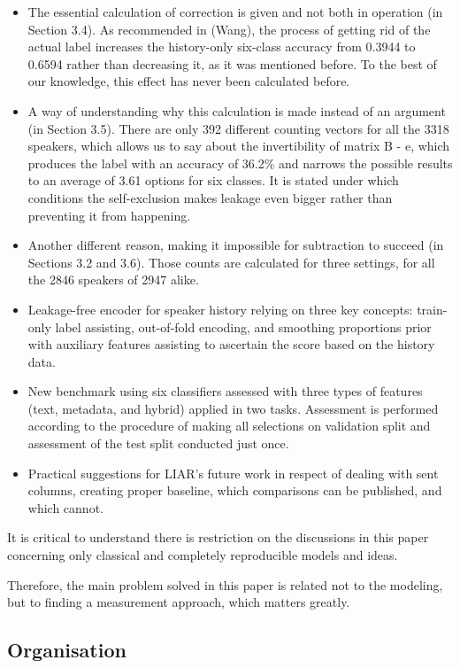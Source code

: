 \documentclass[10pt,twocolumn,twoside,a4paper]{article}
\begin{document}
\begin{itemize}
\item The essential calculation of correction is given and not both in operation (in Section 3.4). As recommended in (Wang), the process of getting rid of the actual label increases the history-only six-class accuracy from 0.3944 to 0.6594 rather than decreasing it, as it was mentioned before. To the best of our knowledge, this effect has never been calculated before.
\item A way of understanding why this calculation is made instead of an argument (in Section 3.5). There are only 392 different counting vectors for all the 3318 speakers, which allows us to say about the invertibility of matrix B - e, which produces the label with an accuracy of 36.2\% and narrows the possible results to an average of 3.61 options for six classes. It is stated under which conditions the self-exclusion makes leakage even bigger rather than preventing it from happening.
\item Another different reason, making it impossible for subtraction to succeed (in Sections 3.2 and 3.6). Those counts are calculated for three settings, for all the 2846 speakers of 2947 alike.
\item Leakage-free encoder for speaker history relying on three key concepts: train-only label assisting, out-of-fold encoding, and smoothing proportions prior with auxiliary features assisting to ascertain the score based on the history data.
\item New benchmark using six classifiers assessed with three types of features (text, metadata, and hybrid) applied in two tasks. Assessment is performed according to the procedure of making all selections on validation split and assessment of the test split conducted just once.
\item Practical suggestions for LIAR's future work in respect of dealing with sent columns, creating proper baseline, which comparisons can be published, and which cannot.
\end{itemize}

It is critical to understand there is restriction on the discussions in this paper concerning only classical and completely reproducible models and ideas.

Therefore, the main problem solved in this paper is related not to the modeling, but to finding a measurement approach, which matters greatly.

\subsection{Organisation}
\end{document}
